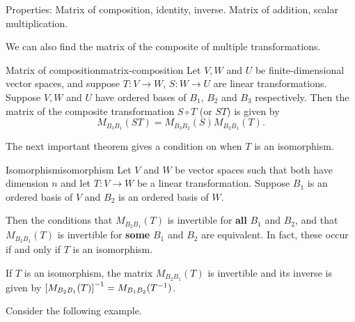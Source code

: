 Properties: Matrix of composition, identity, inverse. Matrix of
addition, scalar multiplication.



We can also find the matrix of the composite of multiple transformations.

\begin{theorem}{Matrix of composition}{matrix-composition}
  Let $V,W$ and $U$ be finite-dimensional vector spaces, and suppose
  $T : V \to W$, $S: W \to U$ are linear transformations.  Suppose
  $V, W$ and $U$ have ordered bases of $B_1$, $B_2$ and $B_3$
  respectively.  Then the matrix of the composite transformation
  $S \circ T$ (or $ST$) is given by
  \begin{equation*}
    M_{B_3B_1}(ST)=M_{B_3B_2}(S) M_{B_2B_1}(T).
  \end{equation*}
\end{theorem}

The next important theorem gives a condition on when $T$ is an isomorphism.

\begin{theorem}{Isomorphism}{isomorphism}
  Let $V$ and $W$ be vector spaces such that both have dimension $n$
  and let $T: V \to W$ be a linear transformation. Suppose $B_1$ is an
  ordered basis of $V$ and $B_2$ is an ordered basis of $W$.

  Then the conditions that $M_{B_2B_1}(T)$ is invertible for
  \textbf{all} $B_1$ and $B_2$, and that $M_{B_2B_1}(T)$ is invertible
  for \textbf{some} $B_1$ and $B_2$ are equivalent. In fact, these
  occur if and only if $T$ is an isomorphism.

  If $T$ is an isomorphism, the matrix $M_{B_2B_1}(T)$ is invertible
  and its inverse is given by
  $\left[M_{B_2B_1}(T) \right] ^{-1} = M_{B_1B_2}(T^{-1})$.
\end{theorem}

Consider the following example.

